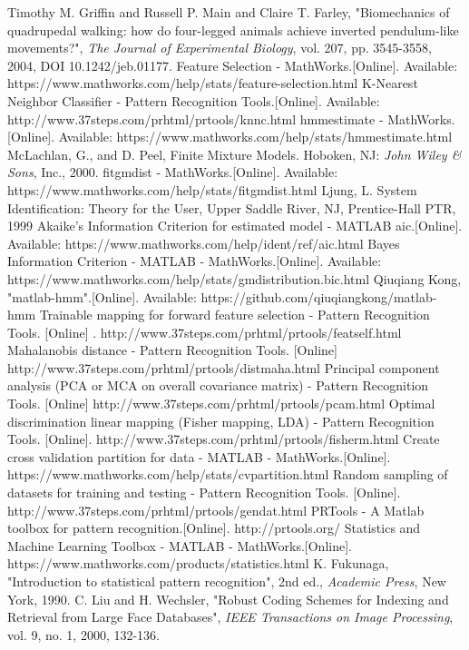 \begin{thebibliography}{5}
 Timothy M. Griffin and Russell P. Main and Claire T. Farley, "Biomechanics of quadrupedal walking: how do four-legged animals achieve
inverted pendulum-like movements?", \emph{The Journal of Experimental Biology}, vol. 207, pp. 3545-3558, 2004, DOI 10.1242/jeb.01177.
 Feature Selection - MathWorks.[Online]. Available: https://www.mathworks.com/help/stats/feature-selection.html
 K-Nearest Neighbor Classifier - Pattern Recognition Tools.[Online]. Available: http://www.37steps.com/prhtml/prtools/knnc.html
 hmmestimate - MathWorks.[Online]. Available: https://www.mathworks.com/help/stats/hmmestimate.html
 McLachlan, G., and D. Peel, Finite Mixture Models. Hoboken, NJ: \emph{John Wiley \& Sons}, Inc., 2000.
 fitgmdist - MathWorks.[Online]. Available:  https://www.mathworks.com/help/stats/fitgmdist.html
 Ljung, L. System Identification: Theory for the User, Upper Saddle River, NJ, Prentice-Hall PTR, 1999
 Akaike's Information Criterion for estimated model - MATLAB aic.[Online]. Available:  https://www.mathworks.com/help/ident/ref/aic.html
 Bayes Information Criterion - MATLAB - MathWorks.[Online]. Available: https://www.mathworks.com/help/stats/gmdistribution.bic.html
 Qiuqiang Kong, "matlab-hmm".[Online]. Available: https://github.com/qiuqiangkong/matlab-hmm
 Trainable mapping for forward feature selection - Pattern Recognition Tools. [Online] . http://www.37steps.com/prhtml/prtools/featself.html
 Mahalanobis distance - Pattern Recognition Tools. [Online] http://www.37steps.com/prhtml/prtools/distmaha.html
 Principal component analysis (PCA or MCA on overall covariance matrix) - Pattern Recognition Tools. [Online] http://www.37steps.com/prhtml/prtools/pcam.html
 Optimal discrimination linear mapping (Fisher mapping, LDA) - Pattern Recognition Tools. [Online]. http://www.37steps.com/prhtml/prtools/fisherm.html
 Create cross validation partition for data - MATLAB - MathWorks.[Online]. https://www.mathworks.com/help/stats/cvpartition.html
 Random sampling of datasets for training and testing - Pattern Recognition Tools. [Online]. http://www.37steps.com/prhtml/prtools/gendat.html
 PRTools - A Matlab toolbox for pattern recognition.[Online]. http://prtools.org/
 Statistics and Machine Learning Toolbox - MATLAB - MathWorks.[Online]. https://www.mathworks.com/products/statistics.html
 K. Fukunaga, "Introduction to statistical pattern recognition", 2nd ed., \emph{Academic Press}, New York, 1990.
 C. Liu and H. Wechsler, "Robust Coding Schemes for Indexing and Retrieval
 from Large Face Databases", \emph{IEEE Transactions on Image Processing}, vol. 9, no. 1, 2000, 132-136.
\end{thebibliography}